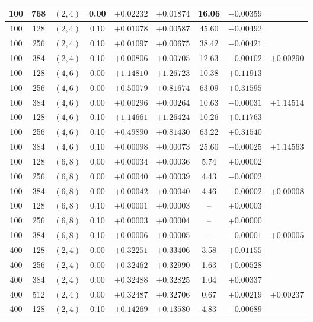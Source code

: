 \begin{table}[!htbp]
\begin{tabular}{@{}ccccccccc@{}}
100  & 768 & $(2,4)$ & 0.00 & $+0.02232$ & $+0.01874$ & 16.06 & $-0.00359$ &  \\
\hline
100  & 128 & $(2,4)$ & 0.10 & $+0.01078$ & $+0.00587$ & 45.60 & $-0.00492$ &  \\
100  & 256 & $(2,4)$ & 0.10 & $+0.01097$ & $+0.00675$ & 38.42 & $-0.00421$ &  \\
100  & 384 & $(2,4)$ & 0.10 & $+0.00806$ & $+0.00705$ & 12.63 & $-0.00102$ & $+0.00290$ \\
\hline
100  & 128 & $(4,6)$ & 0.00 & $+1.14810$ & $+1.26723$ & 10.38 & $+0.11913$ &  \\
100  & 256 & $(4,6)$ & 0.00 & $+0.50079$ & $+0.81674$ & 63.09 & $+0.31595$ &  \\
100  & 384 & $(4,6)$ & 0.00 & $+0.00296$ & $+0.00264$ & 10.63 & $-0.00031$ & $+1.14514$ \\
\hline
100  & 128 & $(4,6)$ & 0.10 & $+1.14661$ & $+1.26424$ & 10.26 & $+0.11763$ &  \\
100  & 256 & $(4,6)$ & 0.10 & $+0.49890$ & $+0.81430$ & 63.22 & $+0.31540$ &  \\
100  & 384 & $(4,6)$ & 0.10 & $+0.00098$ & $+0.00073$ & 25.60 & $-0.00025$ & $+1.14563$ \\
\hline
100  & 128 & $(6,8)$ & 0.00 & $+0.00034$ & $+0.00036$ &  5.74 & $+0.00002$ &  \\
100  & 256 & $(6,8)$ & 0.00 & $+0.00040$ & $+0.00039$ &  4.43 & $-0.00002$ &  \\
100  & 384 & $(6,8)$ & 0.00 & $+0.00042$ & $+0.00040$ &  4.46 & $-0.00002$ & $+0.00008$ \\
\hline
100  & 128 & $(6,8)$ & 0.10 & $+0.00001$ & $+0.00003$ & -- & $+0.00003$ &  \\
100  & 256 & $(6,8)$ & 0.10 & $+0.00003$ & $+0.00004$ & -- & $+0.00000$ &  \\
100  & 384 & $(6,8)$ & 0.10 & $+0.00006$ & $+0.00005$ & -- & $-0.00001$ & $+0.00005$ \\
\hline
400  & 128 & $(2,4)$ & 0.00 & $+0.32251$ & $+0.33406$ &  3.58 & $+0.01155$ &  \\
400  & 256 & $(2,4)$ & 0.00 & $+0.32462$ & $+0.32990$ &  1.63 & $+0.00528$ &  \\
400  & 384 & $(2,4)$ & 0.00 & $+0.32488$ & $+0.32825$ &  1.04 & $+0.00337$ &  \\
400  & 512 & $(2,4)$ & 0.00 & $+0.32487$ & $+0.32706$ &  0.67 & $+0.00219$ & $+0.00237$ \\
\hline
400  & 128 & $(2,4)$ & 0.10 & $+0.14269$ & $+0.13580$ &  4.83 & $-0.00689$ &  \\

\end{tabular}
\end{table}
